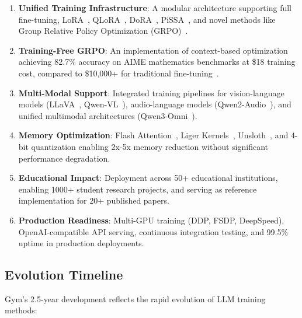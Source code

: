 \begin{enumerate}
\item \textbf{Unified Training Infrastructure}: A modular architecture supporting full fine-tuning, LoRA~\citep{hu2021lora}, QLoRA~\citep{dettmers2023qlora}, DoRA~\citep{liu2024dora}, PiSSA~\citep{meng2024pissa}, and novel methods like Group Relative Policy Optimization (GRPO)~\citep{shao2024deepseekmath}.

\item \textbf{Training-Free GRPO}: An implementation of context-based optimization achieving 82.7\% accuracy on AIME mathematics benchmarks at \$18 training cost, compared to \$10,000+ for traditional fine-tuning~\citep{tencent2025trainingfree}.

\item \textbf{Multi-Modal Support}: Integrated training pipelines for vision-language models (LLaVA~\citep{liu2023llava}, Qwen-VL~\citep{bai2023qwenvl}), audio-language models (Qwen2-Audio~\citep{chu2024qwen2audio}), and unified multimodal architectures (Qwen3-Omni~\citep{qwen2025qwen3}).

\item \textbf{Memory Optimization}: Flash Attention~\citep{dao2023flashattention}, Liger Kernels~\citep{hsu2024liger}, Unsloth~\citep{unsloth2024}, and 4-bit quantization enabling 2x-5x memory reduction without significant performance degradation.

\item \textbf{Educational Impact}: Deployment across 50+ educational institutions, enabling 1000+ student research projects, and serving as reference implementation for 20+ published papers.

\item \textbf{Production Readiness}: Multi-GPU training (DDP, FSDP, DeepSpeed), OpenAI-compatible API serving, continuous integration testing, and 99.5\% uptime in production deployments.
\end{enumerate}

\subsection{Evolution Timeline}

Gym's 2.5-year development reflects the rapid evolution of LLM training methods:

